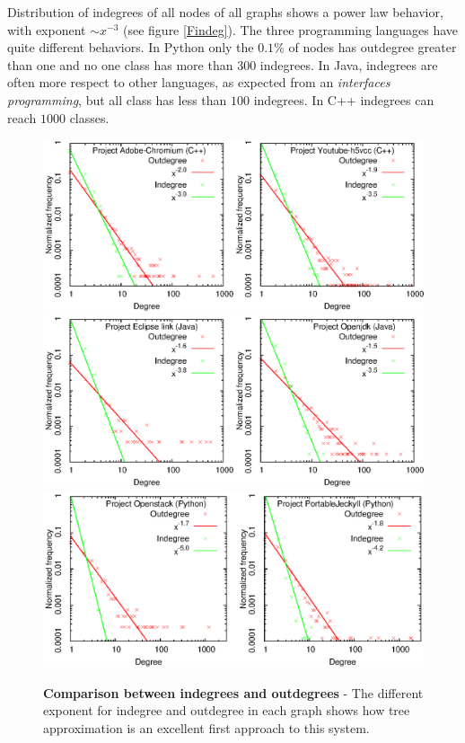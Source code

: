 Distribution of indegrees of all nodes of all graphs shows a power law behavior, with exponent $\sim x^{-3}$ (see figure \ref{Findeg}). The three programming languages have quite different behaviors. In Python only the $0.1\%$ of nodes has outdegree greater than one and no one class has more than $300$ indegrees. In Java, indegrees are often more respect to other languages, as expected from an \textit{interfaces programming}, but all class has less than $100$ indegrees. In C++ indegrees can reach $1000$ classes.

\begin{figure}[p]%
\includegraphics[width=\textwidth,draft=false]{grafici/cppinout.eps}
\includegraphics[width=\textwidth,draft=false]{grafici/javainout.eps}
\includegraphics[width=\textwidth,draft=false]{grafici/pyinout.eps}
\caption{\label{Finoutd} \footnotesize\textbf{Comparison between indegrees and outdegrees} - The different exponent for indegree and outdegree in each graph shows how tree approximation is an excellent first approach to this system.}
\end{figure}

